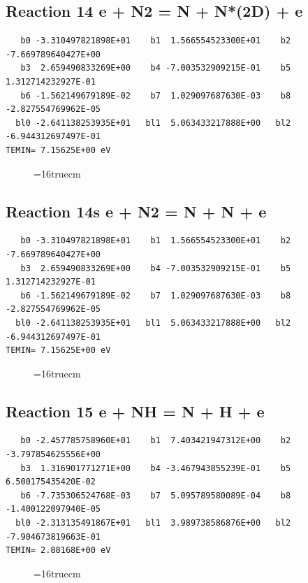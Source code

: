 \documentclass[12pt,dvipdfm]{article}
\begin{document}
\subsection{
Reaction 14 e + N2 = N + N*(2D) + e}
\begin{small}\begin{verbatim}
   b0 -3.310497821898E+01    b1  1.566554523300E+01    b2 -7.669789640427E+00
   b3  2.659490833269E+00    b4 -7.003532909215E-01    b5  1.312714232927E-01
   b6 -1.562149679189E-02    b7  1.029097687630E-03    b8 -2.827554769962E-05
  bl0 -2.641138253935E+01   bl1  5.063433217888E+00   bl2 -6.944312697497E-01
TEMIN= 7.15625E+00 eV
   \end{verbatim}\end{small}
\begin{figure}[h!]
\label{n2rates}
\epsfxsize=16truecm
\end{figure}
\newpage

\subsection{
Reaction 14s e + N2 = N + N + e }
\begin{small}\begin{verbatim}
   b0 -3.310497821898E+01    b1  1.566554523300E+01    b2 -7.669789640427E+00
   b3  2.659490833269E+00    b4 -7.003532909215E-01    b5  1.312714232927E-01
   b6 -1.562149679189E-02    b7  1.029097687630E-03    b8 -2.827554769962E-05
  bl0 -2.641138253935E+01   bl1  5.063433217888E+00   bl2 -6.944312697497E-01
TEMIN= 7.15625E+00 eV
   \end{verbatim}\end{small}
\begin{figure}[h!]
\label{n2rates}
\epsfxsize=16truecm
\end{figure}
\newpage

\subsection{
Reaction 15 e + NH = N + H + e}
\begin{small}\begin{verbatim}
   b0 -2.457785758960E+01    b1  7.403421947312E+00    b2 -3.797854625556E+00
   b3  1.316901771271E+00    b4 -3.467943855239E-01    b5  6.500175435420E-02
   b6 -7.735306524768E-03    b7  5.095789580089E-04    b8 -1.400122097940E-05
  bl0 -2.313135491867E+01   bl1  3.989738586876E+00   bl2 -7.904673819663E-01
TEMIN= 2.88168E+00 eV
   \end{verbatim}\end{small}
\begin{figure}[h!]
\label{n2rates}
\epsfxsize=16truecm
\end{figure}
\newpage
\end{document}
